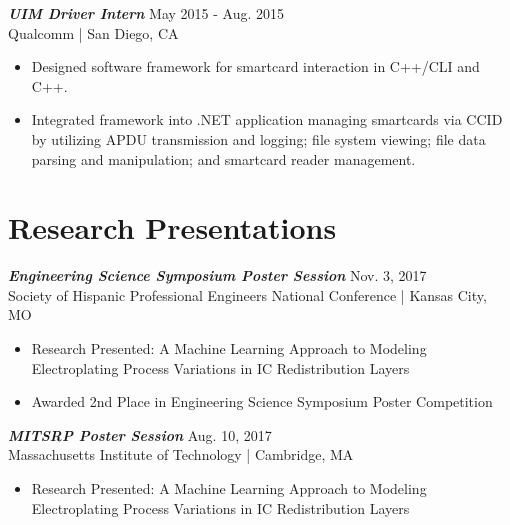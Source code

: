 \documentclass[letter]{res}
\begin{document}
\begin{resume}
\vspace{-2mm}

{\sl \textbf{UIM Driver Intern}} \hfill May 2015 - Aug. 2015\\
Qualcomm | San Diego, CA \newline
 
 \vspace{-4mm}
 
 \begin{itemize}
 \item Designed software framework for smartcard interaction in C++/CLI and C++.
 \item Integrated framework into .NET application managing smartcards via CCID by utilizing APDU transmission and logging; file system viewing; file data parsing and manipulation; and smartcard reader management.
 \end{itemize}

\vspace{-4mm}

\section{Research Presentations}
{\sl \textbf{Engineering Science Symposium Poster Session}} \hfill Nov. 3, 2017\\
Society of Hispanic Professional Engineers National Conference | Kansas City, MO \newline

 \vspace{-4mm}
    
 \begin{itemize}
 \item Research Presented: A Machine Learning Approach to Modeling Electroplating Process Variations in IC Redistribution Layers
 \item Awarded 2nd Place in Engineering Science Symposium Poster Competition
 \end{itemize}
 
\vspace{-2mm}

{\sl \textbf{MITSRP Poster Session}} \hfill Aug. 10, 2017\\
Massachusetts Institute of Technology | Cambridge, MA\newline

 \vspace{-4mm}
 
\begin{itemize}
 \item Research Presented: A Machine Learning Approach to Modeling Electroplating Process Variations in IC Redistribution Layers
 \end{itemize}


\end{resume}
\end{document}
